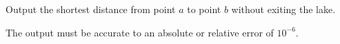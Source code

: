 

Output the shortest distance from point $a$ to point $b$ without
exiting the lake.

The output must be accurate to an absolute or relative error of $10^{-6}$.
